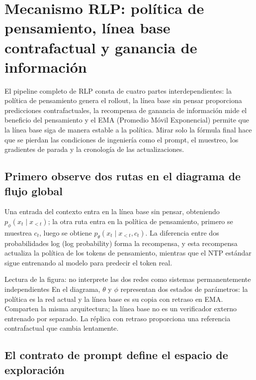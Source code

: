 \section{Mecanismo RLP: política de pensamiento, línea base contrafactual y ganancia de información}

El pipeline completo de RLP consta de cuatro partes interdependientes: la política de pensamiento genera el rollout, la línea base sin pensar proporciona predicciones contrafactuales, la recompensa de ganancia de información mide el beneficio del pensamiento y el EMA (Promedio Móvil Exponencial) permite que la línea base siga de manera estable a la política. Mirar solo la fórmula final hace que se pierdan las condiciones de ingeniería como el prompt, el muestreo, los gradientes de parada y la cronología de las actualizaciones.

\subsection{Primero observe dos rutas en el diagrama de flujo global}

Una entrada del contexto entra en la línea base sin pensar, obteniendo $p_\phi(x_t\mid x_{<t})$; la otra ruta entra en la política de pensamiento, primero se muestrea $c_t$, luego se obtiene $p_\theta(x_t\mid x_{<t},c_t)$. La diferencia entre dos probabilidades log (log probability) forma la recompensa, y esta recompensa actualiza la política de los tokens de pensamiento, mientras que el NTP estándar sigue entrenando al modelo para predecir el token real.


\begin{knowledgebox}{Lectura de la figura: no interprete las dos redes como sistemas permanentemente independientes}
En el diagrama, $\theta$ y $\phi$ representan dos estados de parámetros: la política es la red actual y la línea base es su copia con retraso en EMA. Comparten la misma arquitectura; la línea base no es un verificador externo entrenado por separado. La réplica con retraso proporciona una referencia contrafactual que cambia lentamente.
\end{knowledgebox}

\subsection{El contrato de prompt define el espacio de exploración}

